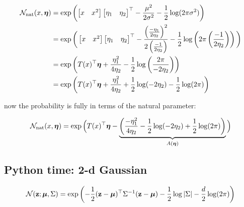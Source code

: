 \documentclass{article}
\begin{document}
\begin{equation}\begin{split}
\mathcal{N}_{\text{nat}}(x, \boldsymbol{\eta}) &= \exp \left(   \begin{bmatrix} x & x^2   \end{bmatrix} \begin{bmatrix} \eta_1  & \eta_2  \end{bmatrix}^\top  - \frac{\mu^2}{ 2 \sigma^2} - \frac{1}{2} \log ( 2 \pi \sigma^2) \right)\\
&= \exp \bigg(   \begin{bmatrix} x & x^2   \end{bmatrix} \begin{bmatrix} \eta_1  & \eta_2  \end{bmatrix}^\top  - \frac{ \left(  \frac{- \eta_1}{ 2 \eta_2} \right)^2}{ 2 \left( \frac{-1}{ 2 \eta_2}  \right) } - \frac{1}{2} \log \left( 2 \pi \left( \frac{-1}{ 2 \eta_2}  \right) \right) \bigg)\\
&= \exp \left(   T(x)^\top \boldsymbol{\eta}  + \frac{\eta_1^2}{4 \eta_2} - \frac{1}{2} \log \left( \frac{ 2 \pi}{ -2 \eta_2}  \right) \right)\\
&= \exp \left(   T(x)^\top \boldsymbol{\eta}  + \frac{\eta_1^2}{4 \eta_2} + \frac{1}{2} \log(-2 \eta_2)  - \frac{1}{2} \log (2 \pi) \right)\\
\end{split}\end{equation}

now the probability is fully in terms of the natural parameter:

\begin{equation}\begin{split}
\mathcal{N}_{\text{nat}}(x, \boldsymbol{\eta}) = \exp \Big(   T(x)^\top \boldsymbol{\eta}  -  \underbrace{\left( \frac{-\eta_1^2}{4 \eta_2} - \frac{1}{2} \log(-2 \eta_2)  + \frac{1}{2} \log (2 \pi) \right) }_{A(\boldsymbol{\eta})}\Big)\\
\end{split}\end{equation}


\subsection{Python time: 2-d Gaussian}

\begin{equation}\begin{split}
\mathcal{N}({\mathbf z}; \boldsymbol{\mu}, \Sigma) &= \exp \left( - \frac{1}{2} ({\mathbf z} - \boldsymbol{\mu})^\top \Sigma^{-1} ({\mathbf z} - \boldsymbol{\mu}) - \frac{1}{2} \log | \Sigma | - \frac{d}{2} \log (2 \pi) \right)\\
\end{split}\end{equation}
\end{document}
